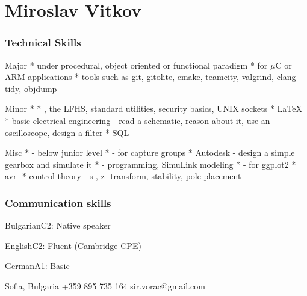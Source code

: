 \documentclass{tccv}
\begin{document}


\part{Miroslav Vitkov}


\section{Technical Skills}
\begin{factlist}
\item{Major}
{
     *  under procedural, object oriented or functional paradigm  \mynext
     *  for $\mu$C or ARM applications  \mynext
     * tools such as git, gitolite, cmake, teamcity, valgrind, clang-tidy, objdump
}
\\
\item{Minor}
{
    *   \mynext
    * , the LFHS, standard utilities, security basics, UNIX sockets  \mynext
    * \LaTeX  \mynext
    * basic electrical engineering - read a schematic, reason about it, use an oscilloscope, design a filter  \mynext
    * {\href{https://github.com/MiroslavVitkov/scripts/tree/master/db/init.sh}{SQL}}
}
\\
\item{Misc}
{
    *  - below junior level  \mynext
    *  - for capture groups  \mynext
    * Autodesk  - design a simple gearbox and simulate it  \mynext
    *  - programming, SimuLink modeling  \mynext
    *  - for ggplot2  \mynext
    * avr-  \mynext
    * control theory - s-, z- transform, stability, pole placement
}
\end{factlist}


\section{Communication skills}
\begin{factlist}
\item{Bulgarian}{C2: Native speaker}
\item{English}{C2: Fluent (Cambridge CPE)}
\item{German}{A1: Basic}
\end{factlist}


\personal
    {Sofia, Bulgaria}
    {+359 895 735 164}
    {sir.vorac@gmail.com}
\end{document}
